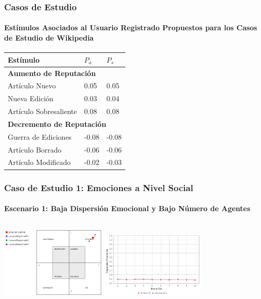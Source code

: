 \documentclass{beamer}
\begin{document}
\begin{frame}
\frametitle{Casos de Estudio}
\framesubtitle{Estímulos Asociados al Usuario Registrado Propuestos para los Casos de Estudio de Wikipedia}
\begin{table}[!ht]
\centering
\scriptsize
\begin{tabular}{lll}
\hline
Estímulo & $P_a$ & $P_s$ \\
\hline\hline
\multicolumn{3}{l}{\textbf{Aumento de Reputación}} \\ \hline\hline
Artículo Nuevo & 0.05 & 0.05  \\ \hline
Nueva Edición & 0.03 & 0.04  \\ \hline
Artículo Sobresaliente & 0.08 & 0.08  \\ \hline\hline
\multicolumn{3}{l}{\textbf{Decremento de Reputación}} \\ \hline\hline
Guerra de Ediciones & -0.08 & -0.08 \\ \hline
Artículo Borrado & -0.06 & -0.06  \\ \hline
Artículo Modificado & -0.02 & -0.03  \\
\hline
\end{tabular}
\end{table}
\end{frame}

\begin{frame}
\frametitle{Caso de Estudio 1: Emociones a Nivel Social}
\framesubtitle{Escenario 1: Baja Dispersión Emocional y Bajo Número de Agentes}
\begin{columns}
\tiny
\centering
\includegraphics[width=5cm]{ilustraciones/caso1escenario1-emocioncentral}
\tiny
\centering
\includegraphics[width=5cm]{ilustraciones/caso1escenario1-dispersionemocional}
\end{columns}
\end{frame}
\end{document}
